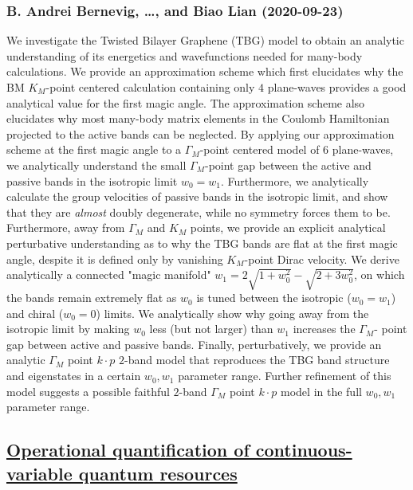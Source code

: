 \subsubsection*{B. Andrei Bernevig, \dots, and Biao Lian (2020-09-23)}
We investigate the Twisted Bilayer Graphene (TBG) model to obtain an analytic
understanding of its energetics and wavefunctions needed for many-body
calculations. We provide an approximation scheme which first elucidates why the
BM $K_M$-point centered calculation containing only $4$ plane-waves provides a
good analytical value for the first magic angle. The approximation scheme also
elucidates why most many-body matrix elements in the Coulomb Hamiltonian
projected to the active bands can be neglected. By applying our approximation
scheme at the first magic angle to a $\Gamma_M$-point centered model of 6
plane-waves, we analytically understand the small $\Gamma_M$-point gap between
the active and passive bands in the isotropic limit $w_0=w_1$. Furthermore, we
analytically calculate the group velocities of passive bands in the isotropic
limit, and show that they are \emph{almost} doubly degenerate, while no
symmetry forces them to be. Furthermore, away from $\Gamma_M$ and $K_M$ points,
we provide an explicit analytical perturbative understanding as to why the TBG
bands are flat at the first magic angle, despite it is defined only by
vanishing $K_M$-point Dirac velocity. We derive analytically a connected "magic
manifold" $w_1=2\sqrt{1+w_0^2}-\sqrt{2+3w_0^2}$, on which the bands remain
extremely flat as $w_0$ is tuned between the isotropic ($w_0=w_1$) and chiral
($w_0=0$) limits. We analytically show why going away from the isotropic limit
by making $w_0$ less (but not larger) than $w_1$ increases the $\Gamma_M$-
point gap between active and passive bands. Finally, perturbatively, we provide
an analytic $\Gamma_M$ point $k\cdot p$ $2$-band model that reproduces the TBG
band structure and eigenstates in a certain $w_0,w_1$ parameter range. Further
refinement of this model suggests a possible faithful $2$-band $\Gamma_M$ point
$k\cdot p$ model in the full $w_0, w_1$ parameter range.

\subsection*{\href{http://arxiv.org/abs/2009.11302v1}{Operational quantification of continuous-variable quantum resources}}
